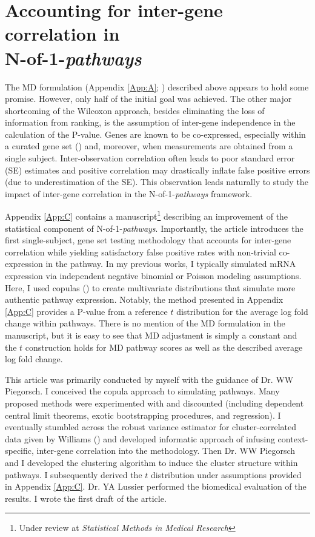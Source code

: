 \chapter{Accounting for inter-gene correlation in\\N-of-1-\emph{pathways}} \label{Chap:ct}

\indent \indent The MD formulation (Appendix \ref{App:A}; \cite{Schissler2015}) described above appears to hold some promise. However, only half of the initial goal was achieved. The other major shortcoming of the Wilcoxon approach, besides eliminating the loss of information from ranking, is the assumption of inter-gene independence in the calculation of the P-value. Genes are known to be co-expressed, especially within a curated gene set (\cite{Tamayo2016}) and, moreover, when measurements are obtained from a single subject. Inter-observation correlation often leads to poor standard error (SE) estimates and positive correlation may drastically inflate false positive errors (due to underestimation of the SE). This observation leads naturally to study the impact of inter-gene correlation in the N-of-1-\emph{pathways} framework.

Appendix \ref{App:C} contains a manuscript\footnote{Under review at \emph{Statistical Methods in Medical Research}} describing an improvement of the statistical component of N-of-1-\emph{pathways}. Importantly, the article introduces the first single-subject, gene set testing methodology that accounts for inter-gene correlation while yielding satisfactory false positive rates with non-trivial co-expression in the pathway. In my previous works, I typically simulated mRNA expression via independent negative binomial or Poisson modeling assumptions. Here, I used copulas (\cite{Genest2007,Yan2007}) to create multivariate distributions that simulate more authentic pathway expression. Notably, the method presented in Appendix \ref{App:C} provides a P-value from a reference $t$ distribution for the average log fold change within pathways. There is no mention of the MD formulation in the manuscript, but it is easy to see that MD adjustment is simply a constant and the $t$ construction holds for MD pathway scores as well as the described average log fold change.

This article was primarily conducted by myself with the guidance of Dr. WW Piegorsch. I conceived the copula approach to simulating pathways. Many proposed methods were experimented with and discounted (including dependent central limit theorems, exotic bootstrapping procedures, and regression). I eventually stumbled across the robust variance estimator for cluster-correlated data given by Williams (\cite{Williams2000}) and developed informatic approach of infusing context-specific, inter-gene correlation into the methodology. Then Dr. WW Piegorsch and I developed the clustering algorithm to induce the cluster structure within pathways. I subsequently derived the $t$ distribution under assumptions provided in Appendix \ref{App:C}. Dr. YA Lussier performed the biomedical evaluation of the results. I wrote the first draft of the article.
